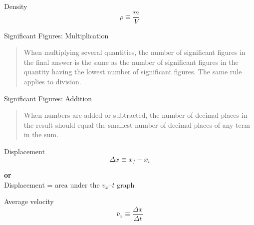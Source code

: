 \documentclass[avery5371]{flashcards}
\begin{document}



\begin{flashcard}[Chapter 1]{Density}
\bigskip
\bigskip
\begin{displaymath}
\rho \equiv \frac{m}{V}
\end{displaymath}
\end{flashcard}

\begin{flashcard}[Chapter 1]{Significant Figures:  Multiplication}
\bigskip
\bigskip
\begin{quote}
When multiplying several quantities, the number of significant figures in the final answer is the same as the number of significant figures in the quantity having the lowest number of significant figures.  The same rule applies to division.
\end{quote}
\hfill
\end{flashcard}

\begin{flashcard}[Chapter 1]{Significant Figures:  Addition}
\bigskip
\bigskip
\begin{quote}
When numbers are added or subtracted, the number of decimal places in the result should equal the smallest number of decimal places of any term in the sum.
\end{quote}
\hfill
\end{flashcard}


\begin{flashcard}[Chapter 2]{Displacement}
\bigskip
\begin{displaymath}
\Delta x \equiv x_{f} - x_{i}
\end{displaymath}
\begin{center}
\textbf{or} \\
\medskip
Displacement = area under the $v_{x}$--$t$ graph
\end{center}
\end{flashcard}

\begin{flashcard}[Chapter 2]{Average velocity}
\bigskip
\bigskip
\begin{displaymath}
\bar{v}_{x} \equiv \frac{\Delta x}{\Delta t} 
\end{displaymath}
\end{flashcard}
\end{document}
